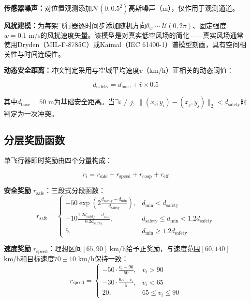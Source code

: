 \documentclass[12pt,a4paper,UTF8]{ctexart}
\begin{document}
\textbf{传感器噪声：}对位置观测添加$\mathcal{N}(0, 0.5^2)$高斯噪声（m），仅作用于观测通道。

\textbf{风扰建模：}为每架飞行器逐时间步添加随机方向$\theta_w \sim \mathcal{U}(0, 2\pi)$、固定强度$w = 0.1$ m/s的风扰速度矢量。该模型是对真实低空风场的简化——真实风场通常使用Dryden（MIL-F-8785C）\cite{ref26}或Kaimal（IEC 61400-1）谱模型刻画，具有空间相关性与时间连续性。

\textbf{动态安全距离：}冲突判定采用与空域平均速度$\bar{v}$（km/h）正相关的动态阈值：

\begin{equation}
    d_{\text{safety}} = d_{\text{base}} + \bar{v} \times 0.5
\end{equation}

其中$d_{\text{base}} = 50$ m为基础安全距离。当$\exists i \neq j,\ \|(x_i, y_i) - (x_j, y_j)\|_2 < d_{\text{safety}}$时判定为一次冲突。

\subsection{分层奖励函数}

单飞行器即时奖励由四个分量构成：

\begin{equation}
    r_i = r_{\text{safe}} + r_{\text{speed}} + r_{\text{coop}} + r_{\text{eff}}
\end{equation}

\textbf{安全奖励} $r_{\text{safe}}$：三段式分段函数：
\begin{equation}
    r_{\text{safe}} =
    \begin{cases}
        -50 \exp\left(2\frac{d_{\text{safety}} - d_{\min}}{d_{\text{safety}}}\right), & d_{\min} < d_{\text{safety}} \\[8pt]
        -10\frac{1.2d_{\text{safety}} - d_{\min}}{0.2d_{\text{safety}}}, & d_{\text{safety}} \leq d_{\min} < 1.2d_{\text{safety}} \\[8pt]
        5, & d_{\min} \geq 1.2d_{\text{safety}}
    \end{cases}
\end{equation}

\textbf{速度奖励} $r_{\text{speed}}$：理想区间$[65, 90]$ km/h给予正奖励，与速度范围$[60, 140]$ km/h和目标速度$70\pm10$ km/h保持一致：
\begin{equation}
    r_{\text{speed}} =
    \begin{cases}
        -50 \cdot \frac{v_i - 90}{50}, & v_i > 90 \\[8pt]
        -30 \cdot \frac{65 - v_i}{5}, & v_i < 65 \\[8pt]
        20, & 65 \leq v_i \leq 90
    \end{cases}
\end{equation}
\end{document}
